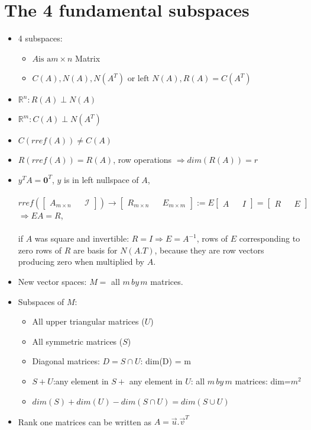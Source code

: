 \documentclass[a4paper,12pt]{article}
\begin{document}
\section{The 4 fundamental subspaces}
\begin{itemize}
	\item 4 subspaces:
	\begin{itemize}
		\item $A \text{is a} m \times n$ Matrix
		\item $C(A),N(A), N(A^T) \text{ or left } N(A), R(A) = C(A^T)$
	\end{itemize}
	\item $\mathbf{\mathbb{R}}^n: R(A) \perp N(A)$ 
	\item $\mathbf{\mathbb{R}}^m: C(A) \perp N(A^T)$
	\item $C(rref(A)) \neq C(A)$
	\item $R(rref(A)) = R(A)$, row operations $\Longrightarrow dim(R(A)) = r$
	\item $y^T A = \mathbf{0}^T $, $y$ is in left nullspace of $A$,\\
	\\
		$rref(\begin{bmatrix}
		A_{m \times n} & & \mathcal{I} 
		\end{bmatrix}) \longrightarrow    
		\begin{bmatrix}
R_{m \times n} & & E_{m \times m}
		\end{bmatrix}		
 := E
 \begin{bmatrix}
 A& & I
 \end{bmatrix}
  = \begin{bmatrix}
   R& & E
   \end{bmatrix}$ \\
   $ \Longrightarrow EA = R$, \\
   \\
		 if $A$ was square and invertible: $R = I \Rightarrow E = A^{-1}$, rows of $E$ corresponding to zero rows of $R$ are basis for $N(A.T)$, because they are row vectors producing zero when multiplied by $A$.
		 
		 \item New vector spaces: $M = $ all $m\,by\,m$ matrices.
		 \item Subspaces of $M$: 
		 \begin{itemize}
		 	\item All upper triangular matrices ($U$)
		 	\item All symmetric matrices ($S$)
		 	\item Diagonal matrices: $D = S \cap U$: dim(D) = m
		 	\item $S+U$:any element in $S +$ any element in $U$: all $m\,by\,m$ matrices: dim=$m^2$
			\item $dim(S)+dim(U) - dim(S \cap U) = dim(S \cup U)$		 	
		 \end{itemize}
		 
		 \item Rank one matrices can be written as $A = \vec{u}.\vec{v}^T$
\end{itemize}
\end{document}
